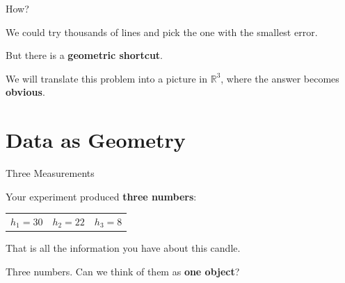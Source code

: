 \documentclass[10pt]{beamer}
\theoremstyle{definition}
\newcommand{\x}[1]{\alert{\textbf{#1}}}
\begin{document}
\begin{frame}{How?}

We could try thousands of lines and pick the one with the smallest error.

\vspace{1em}

But there is a \x{geometric shortcut}.

\vspace{1em}

We will translate this problem into a picture in $\mathbb{R}^3$, where the answer becomes \x{obvious}.

\end{frame}


%
\section{Data as Geometry}



\begin{frame}{Three Measurements}

Your experiment produced \x{three numbers}:

\vspace{1em}

\begin{center}
\begin{tabular}{ccc}
\large $h_1 = 30$ & \large $h_2 = 22$ & \large $h_3 = 8$
\end{tabular}
\end{center}

\vspace{1em}

That is all the information you have about this candle.

\vspace{0.5em}

Three numbers. Can we think of them as \x{one object}?

\end{frame}
\end{document}
